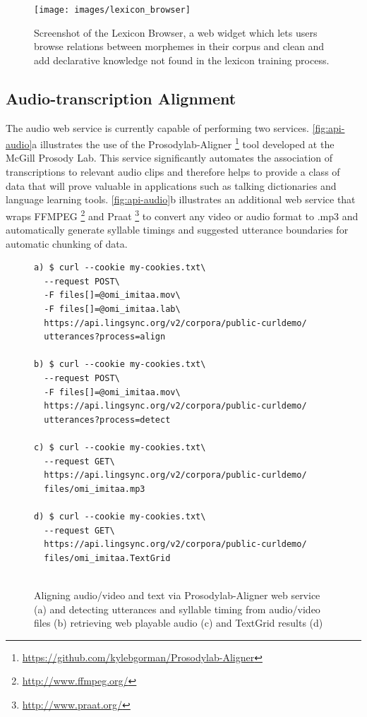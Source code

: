 \documentclass[11pt]{article}
\begin{document}
\begin{figure}
\begin{center}
\texttt{[image: images/lexicon\_browser]}
\caption{Screenshot of the Lexicon Browser, a web widget which lets users browse relations between morphemes in their corpus and clean and add declarative knowledge not found in the lexicon training process.}
\label{lexicon_browser_screenshot}
\end{center}
\end{figure}




\subsection{Audio-transcription Alignment}
\label{sec:aligner}

The audio web service is currently capable of performing two services.
\autoref{fig:api-audio}a illustrates the use of the
Prosodylab-Aligner%
\footnote{\url{https://github.com/kylebgorman/Prosodylab-Aligner}} %
tool developed at the McGill Prosody Lab. This service significantly automates
the association of transcriptions to relevant audio clips and therefore helps
to provide a class of data that will prove valuable in applications such as
talking dictionaries and language learning tools. \autoref{fig:api-audio}b
illustrates an additional web service that wraps
FFMPEG%
\footnote{\url{http://www.ffmpeg.org/}} %
and Praat%
\footnote{\url{http://www.praat.org/}} %
to convert any video or audio format to .mp3 and automatically generate
syllable timings and suggested utterance boundaries \cite{DeJong:2009} for automatic chunking of
data.


\begin{figure}[h]
\scriptsize
\begin{verbatim}
a) $ curl --cookie my-cookies.txt\
  --request POST\
  -F files[]=@omi_imitaa.mov\
  -F files[]=@omi_imitaa.lab\
  https://api.lingsync.org/v2/corpora/public-curldemo/
  utterances?process=align

b) $ curl --cookie my-cookies.txt\
  --request POST\
  -F files[]=@omi_imitaa.mov\
  https://api.lingsync.org/v2/corpora/public-curldemo/
  utterances?process=detect
  
c) $ curl --cookie my-cookies.txt\
  --request GET\
  https://api.lingsync.org/v2/corpora/public-curldemo/
  files/omi_imitaa.mp3
 
d) $ curl --cookie my-cookies.txt\
  --request GET\
  https://api.lingsync.org/v2/corpora/public-curldemo/
  files/omi_imitaa.TextGrid
   
\end{verbatim}
\caption{Aligning audio/video and text via Prosodylab-Aligner web service (a) and detecting utterances and syllable timing from audio/video files (b) retrieving web playable audio (c) and TextGrid results (d)}
\normalsize
\label{fig:api-audio}
\end{figure}
\end{document}
